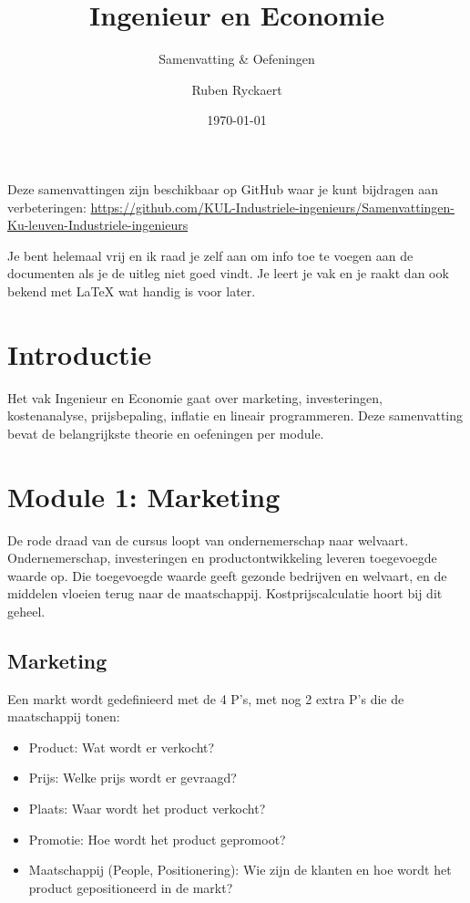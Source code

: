 \documentclass[a4paper,11pt]{article}
\title{Ingenieur en Economie}
\subtitle{Samenvatting \& Oefeningen}
\author{Ruben Ryckaert}
\date{\today}
\begin{document}
\maketitle
\noindent Deze samenvattingen zijn beschikbaar op GitHub waar je kunt bijdragen aan verbeteringen:
\url{https://github.com/KUL-Industriele-ingenieurs/Samenvattingen-Ku-leuven-Industriele-ingenieurs}

Je bent helemaal vrij en ik raad je zelf aan om info toe te voegen aan de documenten als je de uitleg niet goed vindt.
Je leert je vak en je raakt dan ook bekend met LaTeX wat handig is voor later.
\tableofcontents

\printformularium

\section*{Introductie}
Het vak Ingenieur en Economie gaat over marketing,
investeringen, kostenanalyse, prijsbepaling, inflatie en
lineair programmeren. Deze samenvatting bevat de belangrijkste
theorie en oefeningen per module.

\section{Module 1: Marketing}
De rode draad van de cursus loopt van ondernemerschap naar welvaart.
Ondernemerschap, investeringen en productontwikkeling leveren toegevoegde waarde op.
Die toegevoegde waarde geeft gezonde bedrijven en welvaart, en de middelen vloeien terug naar de maatschappij.
Kostprijscalculatie hoort bij dit geheel.

\subsection{Marketing}

Een markt wordt gedefinieerd met de 4 P's, met nog 2 extra P's die de maatschappij tonen:
\begin{itemize}
    \item Product: Wat wordt er verkocht?
    \item Prijs: Welke prijs wordt er gevraagd?
    \item Plaats: Waar wordt het product verkocht?
    \item Promotie: Hoe wordt het product gepromoot?
    \item Maatschappij (People, Positionering): Wie zijn de klanten en hoe wordt het product gepositioneerd in de markt?
\end{itemize}
\end{document}
